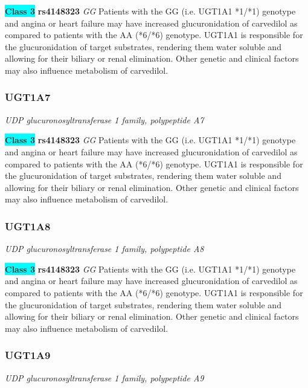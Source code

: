 \documentclass{report}
\begin{document}
\textbf{\colorbox{cyan} {Class 3}} \textbf{ rs4148323 } \textit{ GG }
Patients with the GG (i.e. UGT1A1 *1/*1) genotype and angina or heart failure may have increased glucuronidation of carvedilol as compared to patients with the AA (*6/*6) genotype. UGT1A1 is responsible for the glucuronidation of target substrates, rendering them water soluble and allowing for their biliary or renal elimination. Other genetic and clinical factors may also influence metabolism of carvedilol.\newline\subsubsection{ UGT1A7 }
\textit{ UDP glucuronosyltransferase 1 family, polypeptide A7 }

\textbf{\colorbox{cyan} {Class 3}} \textbf{ rs4148323 } \textit{ GG }
Patients with the GG (i.e. UGT1A1 *1/*1) genotype and angina or heart failure may have increased glucuronidation of carvedilol as compared to patients with the AA (*6/*6) genotype. UGT1A1 is responsible for the glucuronidation of target substrates, rendering them water soluble and allowing for their biliary or renal elimination. Other genetic and clinical factors may also influence metabolism of carvedilol.\newline\subsubsection{ UGT1A8 }
\textit{ UDP glucuronosyltransferase 1 family, polypeptide A8 }

\textbf{\colorbox{cyan} {Class 3}} \textbf{ rs4148323 } \textit{ GG }
Patients with the GG (i.e. UGT1A1 *1/*1) genotype and angina or heart failure may have increased glucuronidation of carvedilol as compared to patients with the AA (*6/*6) genotype. UGT1A1 is responsible for the glucuronidation of target substrates, rendering them water soluble and allowing for their biliary or renal elimination. Other genetic and clinical factors may also influence metabolism of carvedilol.\newline\subsubsection{ UGT1A9 }
\textit{ UDP glucuronosyltransferase 1 family, polypeptide A9 }
\end{document}
